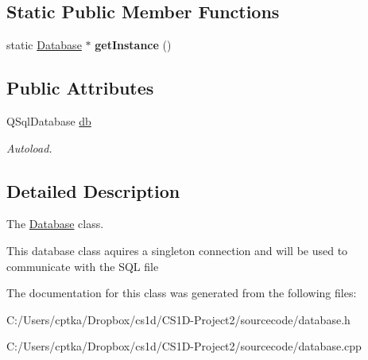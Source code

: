 \subsection*{Static Public Member Functions}
\begin{DoxyCompactItemize}
\item 
\mbox{\label{class_database_a5a3b028f980a577ea0b809eb92312761}} 
static \mbox{\hyperlink{class_database}{Database}} $\ast$ {\bfseries get\+Instance} ()
\end{DoxyCompactItemize}
\subsection*{Public Attributes}
\begin{DoxyCompactItemize}
\item 
\mbox{\label{class_database_a5fb61ee7bb582c53e52f322ace0a787e}} 
Q\+Sql\+Database \mbox{\hyperlink{class_database_a5fb61ee7bb582c53e52f322ace0a787e}{db}}
\begin{DoxyCompactList}\small\item\em Autoload. \end{DoxyCompactList}\end{DoxyCompactItemize}


\subsection{Detailed Description}
The \mbox{\hyperlink{class_database}{Database}} class. 

This database class aquires a singleton connection and will be used to communicate with the S\+QL file 

The documentation for this class was generated from the following files\+:\begin{DoxyCompactItemize}
\item 
C\+:/\+Users/cptka/\+Dropbox/cs1d/\+C\+S1\+D-\/\+Project2/sourcecode/database.\+h\item 
C\+:/\+Users/cptka/\+Dropbox/cs1d/\+C\+S1\+D-\/\+Project2/sourcecode/database.\+cpp\end{DoxyCompactItemize}
